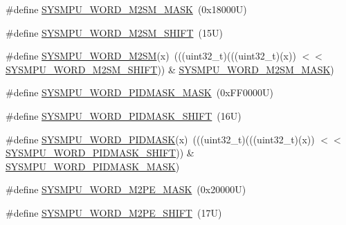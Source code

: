 \begin{DoxyCompactItemize}
\item 
\#define \mbox{\hyperlink{group___s_y_s_m_p_u___register___masks_ga7a322573a604903a73bf503d186f29a1}{S\+Y\+S\+M\+P\+U\+\_\+\+W\+O\+R\+D\+\_\+\+M2\+S\+M\+\_\+\+M\+A\+SK}}~(0x18000\+U)
\item 
\#define \mbox{\hyperlink{group___s_y_s_m_p_u___register___masks_ga0adcb59fe9361718c49b07222d12af9e}{S\+Y\+S\+M\+P\+U\+\_\+\+W\+O\+R\+D\+\_\+\+M2\+S\+M\+\_\+\+S\+H\+I\+FT}}~(15\+U)
\item 
\#define \mbox{\hyperlink{group___s_y_s_m_p_u___register___masks_gae2a6fc63c275f7905d6449c6191bcfdf}{S\+Y\+S\+M\+P\+U\+\_\+\+W\+O\+R\+D\+\_\+\+M2\+SM}}(x)~(((uint32\+\_\+t)(((uint32\+\_\+t)(x)) $<$$<$ \mbox{\hyperlink{group___s_y_s_m_p_u___register___masks_ga0adcb59fe9361718c49b07222d12af9e}{S\+Y\+S\+M\+P\+U\+\_\+\+W\+O\+R\+D\+\_\+\+M2\+S\+M\+\_\+\+S\+H\+I\+FT}})) \& \mbox{\hyperlink{group___s_y_s_m_p_u___register___masks_ga7a322573a604903a73bf503d186f29a1}{S\+Y\+S\+M\+P\+U\+\_\+\+W\+O\+R\+D\+\_\+\+M2\+S\+M\+\_\+\+M\+A\+SK}})
\item 
\#define \mbox{\hyperlink{group___s_y_s_m_p_u___register___masks_ga3d4c41e9862f07cba0f94d84e217b383}{S\+Y\+S\+M\+P\+U\+\_\+\+W\+O\+R\+D\+\_\+\+P\+I\+D\+M\+A\+S\+K\+\_\+\+M\+A\+SK}}~(0x\+F\+F0000\+U)
\item 
\#define \mbox{\hyperlink{group___s_y_s_m_p_u___register___masks_ga6df5c084bcf6d1e6848665ffd9007140}{S\+Y\+S\+M\+P\+U\+\_\+\+W\+O\+R\+D\+\_\+\+P\+I\+D\+M\+A\+S\+K\+\_\+\+S\+H\+I\+FT}}~(16\+U)
\item 
\#define \mbox{\hyperlink{group___s_y_s_m_p_u___register___masks_ga8d86a5d6a523cc8affea1df3cafd27c3}{S\+Y\+S\+M\+P\+U\+\_\+\+W\+O\+R\+D\+\_\+\+P\+I\+D\+M\+A\+SK}}(x)~(((uint32\+\_\+t)(((uint32\+\_\+t)(x)) $<$$<$ \mbox{\hyperlink{group___s_y_s_m_p_u___register___masks_ga6df5c084bcf6d1e6848665ffd9007140}{S\+Y\+S\+M\+P\+U\+\_\+\+W\+O\+R\+D\+\_\+\+P\+I\+D\+M\+A\+S\+K\+\_\+\+S\+H\+I\+FT}})) \& \mbox{\hyperlink{group___s_y_s_m_p_u___register___masks_ga3d4c41e9862f07cba0f94d84e217b383}{S\+Y\+S\+M\+P\+U\+\_\+\+W\+O\+R\+D\+\_\+\+P\+I\+D\+M\+A\+S\+K\+\_\+\+M\+A\+SK}})
\item 
\#define \mbox{\hyperlink{group___s_y_s_m_p_u___register___masks_ga7f72b16598726a30a3fcd0f69e5f88f1}{S\+Y\+S\+M\+P\+U\+\_\+\+W\+O\+R\+D\+\_\+\+M2\+P\+E\+\_\+\+M\+A\+SK}}~(0x20000\+U)
\item 
\#define \mbox{\hyperlink{group___s_y_s_m_p_u___register___masks_gaa7e65aacdb7fea3b44442a9262ed6232}{S\+Y\+S\+M\+P\+U\+\_\+\+W\+O\+R\+D\+\_\+\+M2\+P\+E\+\_\+\+S\+H\+I\+FT}}~(17\+U)
\item 

\end{DoxyCompactItemize}
